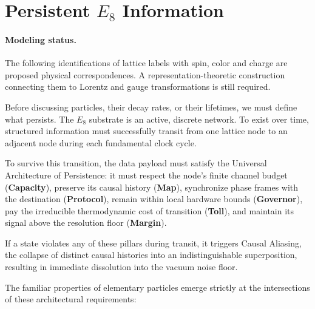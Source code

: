 \section{Persistent \texorpdfstring{$E_8$}{E8} Information}

\paragraph{Modeling status.} The following identifications of lattice labels with spin, color and charge are proposed physical correspondences. A representation-theoretic construction connecting them to Lorentz and gauge transformations is still required.

Before discussing particles, their decay rates, or their lifetimes, we must define what persists. The $E_8$ substrate is an active, discrete network. To exist over time, structured information must successfully transit from one lattice node to an adjacent node during each fundamental clock cycle. 

To survive this transition, the data payload must satisfy the Universal Architecture of Persistence: it must respect the node's finite channel budget (\textbf{Capacity}), preserve its causal history (\textbf{Map}), synchronize phase frames with the destination (\textbf{Protocol}), remain within local hardware bounds (\textbf{Governor}), pay the irreducible thermodynamic cost of transition (\textbf{Toll}), and maintain its signal above the resolution floor (\textbf{Margin}).

If a state violates any of these pillars during transit, it triggers Causal Aliasing, the collapse of distinct causal histories into an indistinguishable superposition, resulting in immediate dissolution into the vacuum noise floor. 

The familiar properties of elementary particles emerge strictly at the intersections of these architectural requirements:

